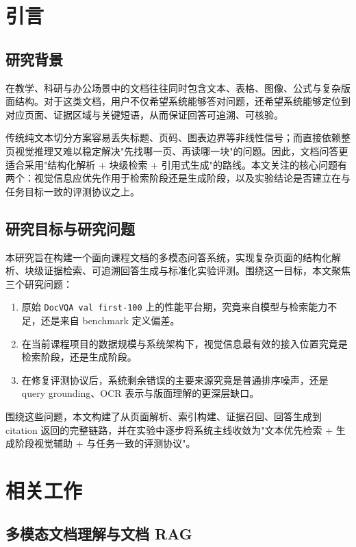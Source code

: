 \documentclass{SYSUReport}
\begin{document}
\section{引言}

\subsection{研究背景}

在教学、科研与办公场景中的文档往往同时包含文本、表格、图像、公式与复杂版面结构。对于这类文档，用户不仅希望系统能够答对问题，还希望系统能够定位到对应页面、证据区域与关键短语，从而保证回答可追溯、可核验。

传统纯文本切分方案容易丢失标题、页码、图表边界等非线性信号；而直接依赖整页视觉推理又难以稳定解决"先找哪一页、再读哪一块"的问题。因此，文档问答更适合采用"结构化解析 + 块级检索 + 引用式生成"的路线。本文关注的核心问题有两个：视觉信息应优先作用于检索阶段还是生成阶段，以及实验结论是否建立在与任务目标一致的评测协议之上。

\subsection{研究目标与研究问题}

本研究旨在构建一个面向课程文档的多模态问答系统，实现复杂页面的结构化解析、块级证据检索、可追溯回答生成与标准化实验评测。围绕这一目标，本文聚焦三个研究问题：

\begin{enumerate}
    \item 原始 \texttt{DocVQA val first-100} 上的性能平台期，究竟来自模型与检索能力不足，还是来自 benchmark 定义偏差。
    \item 在当前课程项目的数据规模与系统架构下，视觉信息最有效的接入位置究竟是检索阶段，还是生成阶段。
    \item 在修复评测协议后，系统剩余错误的主要来源究竟是普通排序噪声，还是 query grounding、OCR 表示与版面理解的更深层缺口。
\end{enumerate}

围绕这些问题，本文构建了从页面解析、索引构建、证据召回、回答生成到 citation 返回的完整链路，并在实验中逐步将系统主线收敛为"文本优先检索 + 生成阶段视觉辅助 + 与任务一致的评测协议"。

\section{相关工作}

\subsection{多模态文档理解与文档 RAG}
\end{document}
